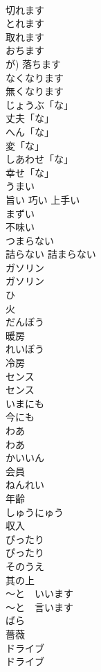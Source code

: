 \documentclass[8pt]{extreport}
\begin{document}
\begin{CJK}{UTF8}{min}
\\	切れます	
\\	とれます	
\\	取れます	
\\	おちます	
\\	が)	落ちます	
\\	なくなります	
\\	無くなります	
\\	じょうぶ「な」	
\\	丈夫「な」	
\\	へん「な」	
\\	変「な」	
\\	しあわせ「な」	
\\	幸せ「な」		
\\	うまい	
\\	旨い 巧い 上手い	
\\	まずい	
\\	不味い	
\\	つまらない	
\\	詰らない 詰まらない	
\\	ガソリン	
\\	ガソリン		
\\	ひ	
\\	火		
\\	だんぼう	
\\	暖房		
\\	れいぼう	
\\	冷房	
\\	センス	
\\	センス	
\\	いまにも	
\\	今にも	
\\	わあ	
\\	わあ		
\\	かいいん	
\\	会員		
\\	ねんれい	
\\	年齢		
\\	しゅうにゅう	
\\	収入		
\\	ぴったり	
\\	ぴったり		
\\	そのうえ	
\\	其の上		
\\	〜と　いいます	
\\	〜と　言います		
\\	ばら	
\\	薔薇		
\\	ドライブ	
\\	ドライブ		

\end{CJK}
\end{document}
